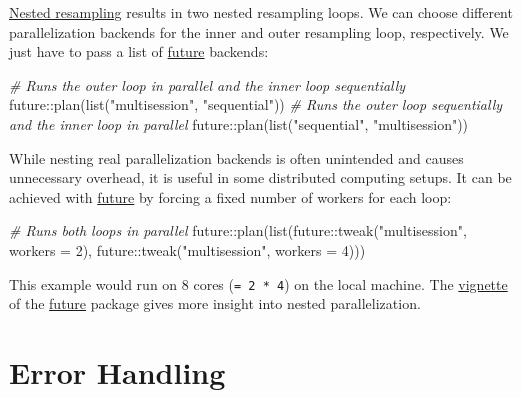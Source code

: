 \documentclass[
]{scrbook}
\newenvironment{Shaded}{\begin{snugshade}}{\end{snugshade}}
\newcommand{\AttributeTok}[1]{\textcolor[rgb]{0.77,0.63,0.00}{#1}}
\newcommand{\CommentTok}[1]{\textcolor[rgb]{0.56,0.35,0.01}{\textit{#1}}}
\newcommand{\DecValTok}[1]{\textcolor[rgb]{0.00,0.00,0.81}{#1}}
\newcommand{\FunctionTok}[1]{\textcolor[rgb]{0.00,0.00,0.00}{#1}}
\newcommand{\NormalTok}[1]{#1}
\newcommand{\SpecialCharTok}[1]{\textcolor[rgb]{0.00,0.00,0.00}{#1}}
\newcommand{\StringTok}[1]{\textcolor[rgb]{0.31,0.60,0.02}{#1}}
\renewenvironment{Shaded} {\begin{snugshade}\small} {\end{snugshade}}
\begin{document}
\protect\hyperlink{nested-resampling}{Nested resampling} results in two nested resampling loops.
We can choose different parallelization backends for the inner and outer resampling loop, respectively.
We just have to pass a list of \href{https://cran.r-project.org/package=future}{future} backends:

\begin{Shaded}
\begin{Highlighting}[]
\CommentTok{\# Runs the outer loop in parallel and the inner loop sequentially}
\NormalTok{future}\SpecialCharTok{::}\FunctionTok{plan}\NormalTok{(}\FunctionTok{list}\NormalTok{(}\StringTok{"multisession"}\NormalTok{, }\StringTok{"sequential"}\NormalTok{))}
\CommentTok{\# Runs the outer loop sequentially and the inner loop in parallel}
\NormalTok{future}\SpecialCharTok{::}\FunctionTok{plan}\NormalTok{(}\FunctionTok{list}\NormalTok{(}\StringTok{"sequential"}\NormalTok{, }\StringTok{"multisession"}\NormalTok{))}
\end{Highlighting}
\end{Shaded}

While nesting real parallelization backends is often unintended and causes unnecessary overhead, it is useful in some distributed computing setups.
It can be achieved with \href{https://cran.r-project.org/package=future}{future} by forcing a fixed number of workers for each loop:

\begin{Shaded}
\begin{Highlighting}[]
\CommentTok{\# Runs both loops in parallel}
\NormalTok{future}\SpecialCharTok{::}\FunctionTok{plan}\NormalTok{(}\FunctionTok{list}\NormalTok{(future}\SpecialCharTok{::}\FunctionTok{tweak}\NormalTok{(}\StringTok{"multisession"}\NormalTok{, }\AttributeTok{workers =} \DecValTok{2}\NormalTok{),}
\NormalTok{  future}\SpecialCharTok{::}\FunctionTok{tweak}\NormalTok{(}\StringTok{"multisession"}\NormalTok{, }\AttributeTok{workers =} \DecValTok{4}\NormalTok{)))}
\end{Highlighting}
\end{Shaded}

This example would run on 8 cores (\texttt{=\ 2\ *\ 4}) on the local machine.
The \href{https://cran.r-project.org/web/packages/future/vignettes/future-3-topologies.html}{vignette} of the \href{https://cran.r-project.org/package=future}{future} package gives more insight into nested parallelization.

\hypertarget{error-handling}{%
\section{Error Handling}\label{error-handling}}
\end{document}
